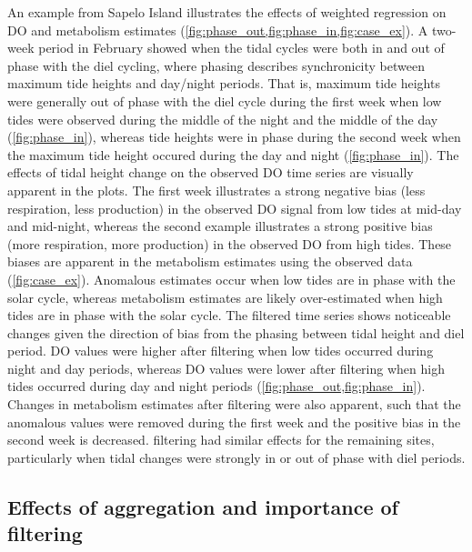 \documentclass[letterpaper,12pt,oneside]{article}\usepackage[]{graphicx}\usepackage[]{color}
\begin{document}
An example from Sapelo Island illustrates the effects of weighted regression on \ac{DO} and metabolism estimates (\cref{fig:phase_out,fig:phase_in,fig:case_ex}).   A two-week period in February showed when the tidal cycles were both in and out of phase with the diel cycling, where phasing describes synchronicity between maximum tide heights and day/night periods.  That is, maximum tide heights were generally out of phase with the diel cycle during the first week when low tides were observed during the middle of the night and the middle of the day (\cref{fig:phase_in}), whereas tide heights were in phase during the second week when the maximum tide height occured during the day and night (\cref{fig:phase_in}).  The effects of tidal height change on the observed \ac{DO} time series are visually apparent in the plots. The first week illustrates a strong negative bias (less respiration, less production) in the observed \ac{DO} signal from low tides at mid-day and mid-night, whereas the second example illustrates a strong positive bias (more respiration, more production) in the observed \ac{DO} from high tides. These biases are apparent in the metabolism estimates using the observed data (\cref{fig:case_ex}).  Anomalous estimates occur when low tides are in phase with the solar cycle, whereas metabolism estimates are likely over-estimated when high tides are in phase with the solar cycle.  The filtered time series shows noticeable changes given the direction of bias from the phasing between tidal height and diel period.  \ac{DO} values were higher after filtering when low tides occurred during night and day periods, whereas \ac{DO} values were lower after filtering when high tides occurred during day and night periods (\cref{fig:phase_out,fig:phase_in}).  Changes in metabolism estimates after filtering were also apparent, such that the anomalous values were removed during the first week and the positive bias in the second week is decreased.  filtering had similar effects for the remaining sites, particularly when tidal changes were strongly in or out of phase with diel periods. 

\subsection{Effects of aggregation and importance of filtering}
\end{document}

